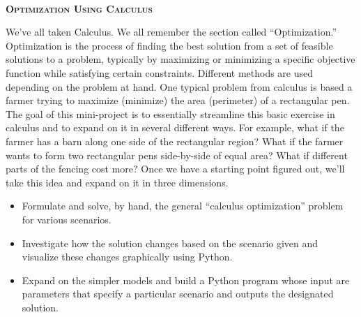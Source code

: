 \documentclass[article, 11pt]{article}
\begin{document}
\begin{center}\\
\Huge{\textbf{\textsc{ Optimization Using Calculus }}} \\ \end{center}

\vspace{.6cm}

\noindent {}

\vspace{-.35cm}
\noindent \hrulefill

We've all taken Calculus.  We all remember the section called ``Optimization.''  Optimization is the process of finding the best solution from a set of feasible solutions to a problem, typically by maximizing or minimizing a specific objective function while satisfying certain constraints. Different methods are used depending on the problem at hand.  One typical problem from calculus is based a farmer trying to maximize (minimize) the area (perimeter) of a rectangular pen.  The goal of this mini-project is to essentially streamline this basic exercise in calculus and to expand on it in several different ways.  For example, what if the farmer has a barn along one side of the rectangular region?  What if the farmer wants to form two rectangular pens side-by-side of equal area?  What if different parts of the fencing cost more?  Once we have a starting point figured out, we'll take this idea and expand on it in three dimensions.  

\noindent {}

\vspace{-.35cm}
\noindent \hrulefill

\begin{itemize}
	\item Formulate and solve, by hand, the general ``calculus optimization'' problem for various scenarios.   
	\item Investigate how the solution changes based on the scenario given and visualize these changes graphically using Python. 
	\item Expand on the simpler models and build a Python program whose input are parameters that specify a particular scenario and outputs the designated solution.  
\end{itemize}

\noindent {}
\end{document}
